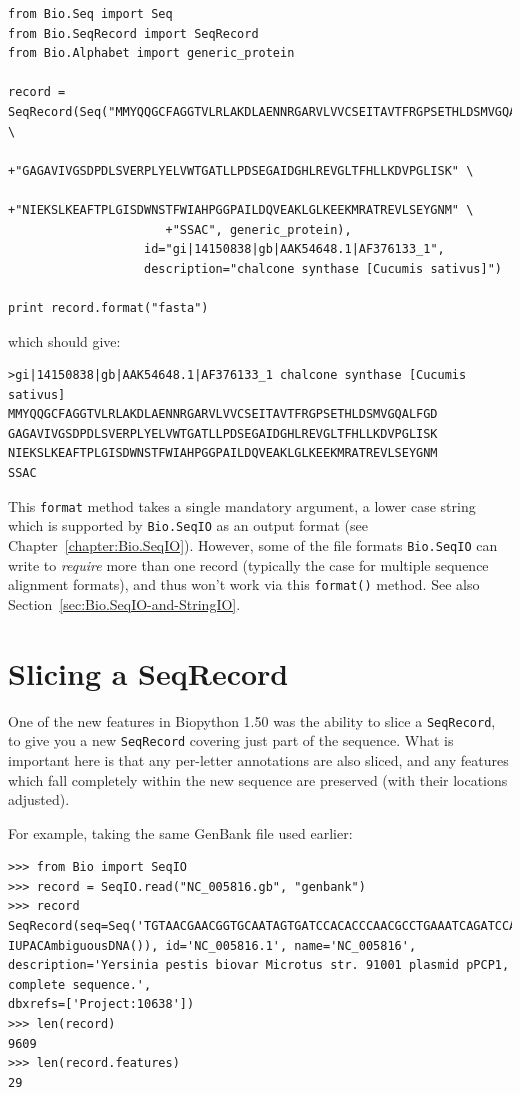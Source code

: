 \documentclass{report}
\begin{document}
\begin{verbatim}
from Bio.Seq import Seq
from Bio.SeqRecord import SeqRecord
from Bio.Alphabet import generic_protein

record = SeqRecord(Seq("MMYQQGCFAGGTVLRLAKDLAENNRGARVLVVCSEITAVTFRGPSETHLDSMVGQALFGD" \
                      +"GAGAVIVGSDPDLSVERPLYELVWTGATLLPDSEGAIDGHLREVGLTFHLLKDVPGLISK" \
                      +"NIEKSLKEAFTPLGISDWNSTFWIAHPGGPAILDQVEAKLGLKEEKMRATREVLSEYGNM" \
                      +"SSAC", generic_protein),
                   id="gi|14150838|gb|AAK54648.1|AF376133_1",
                   description="chalcone synthase [Cucumis sativus]")
                   
print record.format("fasta")
\end{verbatim}
\noindent which should give:
\begin{verbatim}
>gi|14150838|gb|AAK54648.1|AF376133_1 chalcone synthase [Cucumis sativus]
MMYQQGCFAGGTVLRLAKDLAENNRGARVLVVCSEITAVTFRGPSETHLDSMVGQALFGD
GAGAVIVGSDPDLSVERPLYELVWTGATLLPDSEGAIDGHLREVGLTFHLLKDVPGLISK
NIEKSLKEAFTPLGISDWNSTFWIAHPGGPAILDQVEAKLGLKEEKMRATREVLSEYGNM
SSAC
\end{verbatim}

This \verb|format| method takes a single mandatory argument, a lower case string which is
supported by \verb|Bio.SeqIO| as an output format (see Chapter~\ref{chapter:Bio.SeqIO}).
However, some of the file formats \verb|Bio.SeqIO| can write to \emph{require} more than
one record (typically the case for multiple sequence alignment formats), and thus won't
work via this \verb|format()| method.  See also Section~\ref{sec:Bio.SeqIO-and-StringIO}.

\section{Slicing a SeqRecord}
\label{sec:SeqRecord-slicing}

One of the new features in Biopython 1.50 was the ability to slice a \verb|SeqRecord|,
to give you a new \verb|SeqRecord| covering just part of the sequence. What is important
here is that any per-letter annotations are also sliced, and any features which fall
completely within the new sequence are preserved (with their locations adjusted).

For example, taking the same GenBank file used earlier:

\begin{verbatim}
>>> from Bio import SeqIO
>>> record = SeqIO.read("NC_005816.gb", "genbank")
>>> record
SeqRecord(seq=Seq('TGTAACGAACGGTGCAATAGTGATCCACACCCAACGCCTGAAATCAGATCCAGG...CTG',
IUPACAmbiguousDNA()), id='NC_005816.1', name='NC_005816',
description='Yersinia pestis biovar Microtus str. 91001 plasmid pPCP1, complete sequence.',
dbxrefs=['Project:10638'])
>>> len(record)
9609
>>> len(record.features)
29
\end{verbatim}
\end{document}
